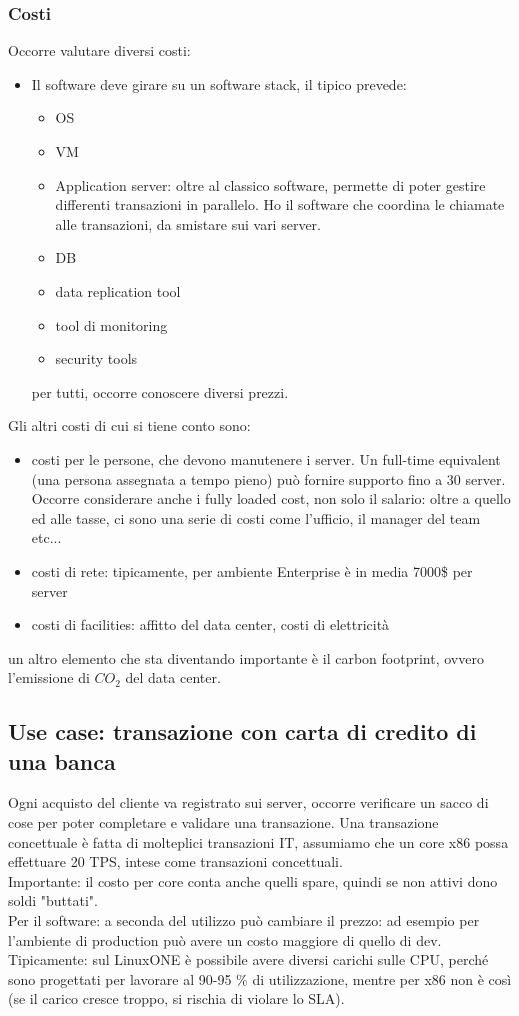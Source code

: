 \documentclass{article}
\begin{document}
\subsubsection{Costi}
Occorre valutare diversi costi:
\begin{itemize}
\item Il software deve girare su un software stack, il tipico prevede:
\begin{itemize}
\item OS
\item VM
\item Application server: oltre al classico software, permette di poter gestire differenti transazioni in parallelo. Ho il software che coordina le chiamate alle transazioni, da smistare sui vari server.
\item DB
\item data replication tool
\item tool di monitoring
\item security tools
\end{itemize}
per tutti, occorre conoscere diversi prezzi.
\end{itemize}
Gli altri costi di cui si tiene conto sono:
\begin{itemize}
\item costi per le persone, che devono manutenere i server. Un full-time equivalent (una persona assegnata a tempo pieno) può fornire supporto fino a 30 server. Occorre considerare anche i fully loaded cost, non solo il salario: oltre a quello ed alle tasse, ci sono una serie di costi come l'ufficio, il manager del team etc...
\item costi di rete: tipicamente, per ambiente Enterprise è in media 7000\$ per server
\item costi di facilities: affitto del data center, costi di elettricità
\end{itemize}
un altro elemento che sta diventando importante è il carbon footprint, ovvero l'emissione di $CO_{2}$ del data center.
\subsection{Use case: transazione con carta di credito di una banca}
Ogni acquisto del cliente va registrato sui server, occorre verificare un sacco di cose per poter completare e validare una transazione. Una transazione concettuale è fatta di molteplici transazioni IT, assumiamo che un core x86 possa effettuare 20 TPS, intese come transazioni concettuali.\\ Importante: il costo per core conta anche quelli spare, quindi se non attivi dono soldi "buttati".\\ Per il software: a seconda del utilizzo può cambiare il prezzo: ad esempio per l'ambiente di production può avere un costo maggiore di quello di dev.\\ Tipicamente: sul LinuxONE è possibile avere diversi carichi sulle CPU, perché sono progettati per lavorare al 90-95 \% di utilizzazione, mentre per x86 non è così (se il carico cresce troppo, si rischia di violare lo SLA).
\end{document}
